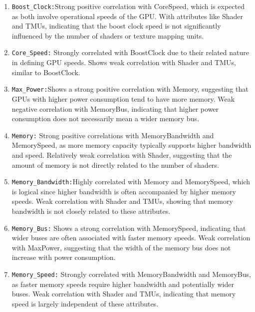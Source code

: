 \documentclass[a4paper]{article}
\theoremstyle{definition}
\begin{document}
\begin{enumerate}
    \item \verb|Boost_Clock:|Strong positive correlation with Core\textunderscore Speed, which is expected as both involve operational speeds of the GPU. With attributes like Shader and TMUs, indicating that the boost clock speed is not significantly influenced by the number of shaders or texture mapping units.

    \item \verb|Core_Speed:| Strongly correlated with Boost\textunderscore Clock due to their related nature in defining GPU speeds. Shows weak correlation with Shader and TMUs, similar to Boost\textunderscore Clock.

     \item \verb|Max_Power:|Shows a strong positive correlation with Memory, suggesting that GPUs with higher power consumption tend to have more memory. Weak negative correlation with Memory\textunderscore Bus, indicating that higher power consumption does not necessarily mean a wider memory bus.

     \item \verb|Memory:| Strong positive correlations with Memory\textunderscore Bandwidth and Memory\textunderscore Speed, as more memory capacity typically supports higher bandwidth and speed. Relatively weak correlation with Shader, suggesting that the amount of memory is not directly related to the number of shaders.

     \item \verb|Memory_Bandwidth:|Highly correlated with Memory and Memory\textunderscore Speed, which is logical since higher bandwidth is often accompanied by higher memory speeds. Weak correlation with Shader and TMUs, showing that memory bandwidth is not closely related to these attributes.

      \item \verb|Memory_Bus:| Shows a strong correlation with Memory\textunderscore Speed, indicating that wider buses are often associated with faster memory speeds. Weak correlation with Max\textunderscore Power, suggesting that the width of the memory bus does not increase with power consumption.

      \item \verb|Memory_Speed:| Strongly correlated with Memory\textunderscore Bandwidth and Memory\textunderscore Bus, as faster memory speeds require higher bandwidth and potentially wider buses. Weak correlation with Shader and TMUs, indicating that memory speed is largely independent of these attributes.


\end{enumerate}
\end{document}
